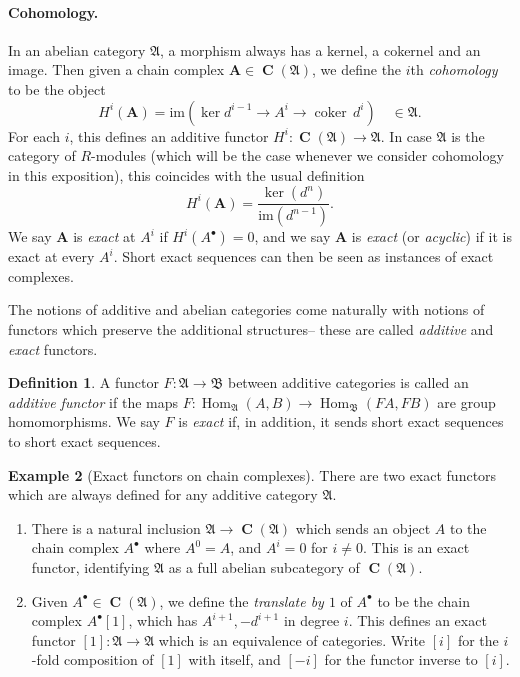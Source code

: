 \documentclass[a4paper]{article}
\theoremstyle{definition}
\newtheorem{defn}{Definition}[section]
\newtheorem{example}[defn]{Example}
\theoremstyle{remark}
\DeclareMathOperator{\coker}{\text{coker}}
\DeclareMathOperator{\Hom}{\text{Hom}}
\DeclareMathOperator{\Ch}{\mathbf{C}}
\begin{document}
\paragraph{Cohomology.} In an abelian category \(\mathfrak{A}\), a morphism always
has a kernel, a cokernel and an image. Then given a chain complex
\(\mathbf{A}\in \Ch(\mathfrak{A})\), we define the \(i\)th \textit{cohomology} to
be the object
\[H^i(\mathbf{A})=\text{im}(\ker d^{i-1}\rightarrow A^i \rightarrow
\coker\, d^i) \quad \in \mathfrak{A}.\]
For each \(i\), this defines an additive functor
\(H^i:\Ch(\mathfrak{A})\rightarrow \mathfrak{A}\). In case \(\mathfrak{A}\) is
the category of \(R\)-modules (which will be the case whenever we consider
cohomology in this exposition), this coincides with the usual definition 
\[H^i(\mathbf{A})=\frac{ \ker(d^n)}{\text{im}(d^{n-1})}.\] 
We say \(\mathbf{A}\) is \textit{exact} at \(A^i\) if \(H^i(A^\bullet)=0\), and
we say \(\mathbf{A}\) is \textit{exact} (or \textit{acyclic}) if it is exact at
every \(A^i\). Short exact sequences can then be seen as instances of exact
complexes. 

The notions of additive and abelian categories come naturally with notions of
functors which preserve the additional structures-- these are called
\textit{additive} and \textit{exact} functors.

\begin{defn}
    A functor \(F:\mathfrak{A}\rightarrow \mathfrak{B}\) between additive
    categories is called an \textit{additive functor} if the maps \(F:
    \Hom_\mathfrak{A}(A,B)\rightarrow \Hom_{\mathfrak{B}}(FA,FB)\) are group
    homomorphisms. We say \(F\) is \textit{exact} if, in addition, it sends
    short exact sequences to short exact sequences.
\end{defn}

\begin{example}[Exact functors on chain complexes] There are two exact functors
    which are always defined for any additive category \(\mathfrak{A}\).
    \begin{enumerate} 
        \item There is a natural inclusion \(\mathfrak{A}\rightarrow
            \Ch(\mathfrak{A})\) which sends an object \(A\) to the chain complex
            \(A^\bullet\) where \(A^0=A\), and \(A^i=0\) for \(i\neq 0\).
            This is an exact functor, identifying \(\mathfrak{A}\) as a
            full abelian subcategory of \(\Ch(\mathfrak{A})\).  
        \item Given \(A^\bullet\in \Ch(\mathfrak{A})\), we define the
            \textit{translate by \(1\)} of \(A^\bullet\) to be the chain complex
            \(A^\bullet[1]\), which has \(A^{i+1},-d^{i+1}\) in degree \(i\).
            This defines an exact functor \([1]:\mathfrak{A}\rightarrow
            \mathfrak{A}\) which is an equivalence of categories. Write \([i]\)
            for the \(i\)-fold composition of \([1]\) with itself, and \([-i]\)
            for the functor inverse to \([i]\).
    \end{enumerate}
\end{example}
\end{document}
